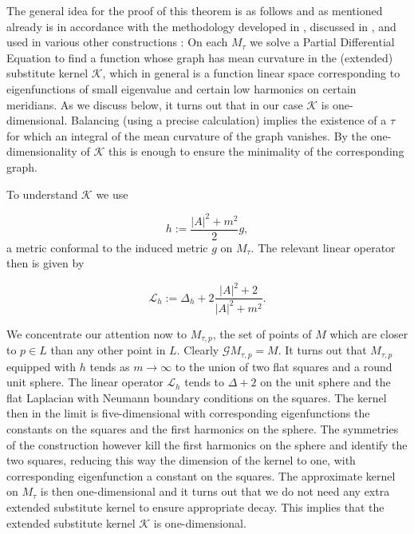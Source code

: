 \documentclass[12pt,namelimits,sumlimits]{amsart}
\theoremstyle{remark}
\numberwithin{equation}{section}
\begin{document}
The general idea for the proof of this theorem is as follows and as mentioned already is in accordance
with the methodology developed in \cite{kapouleas:wente:announce,kapouleas:wente,kapouleas:imc},
discussed in \cite{kapouleas:survey},
and used in various other constructions
\cite{kapouleas:finite,haskins:kapouleas:invent,haskins:kapouleas:survey}:
On each $M_\tau$ we solve a Partial Differential Equation to find a function
whose graph has mean curvature in the (extended) substitute kernel ${\mathscr{K}}$,
which in general is a function linear space corresponding to eigenfunctions of small eigenvalue
and certain low harmonics on certain meridians.
As we discuss below, it turns out that in our case ${\mathscr{K}}$ is one-dimensional.
Balancing (using a precise calculation) implies the existence of a $\tau$
for which an integral of the mean curvature of the graph vanishes.
By the one-dimensionality of ${\mathscr{K}}$ this is enough to ensure the minimality of the corresponding graph.

To understand ${\mathscr{K}}$ we use 
\addtocounter{theorem}{1}
\begin{equation}
\label{Eh}
h:=\frac{|A|^2+m^2}{2}g,
\end{equation}
a metric conformal to the induced metric $g$ on $M_\tau$.
The relevant linear operator then is given by 
\addtocounter{theorem}{1}
\begin{equation}
\label{ELh}
{\ensuremath{\mathcal L_h}}:=\Delta_h+2\frac{|A|^2+2}{|A|^2+m^2}.
\end{equation}

We concentrate our attention now to $M_{\tau,p}$,
the set of points of $M$ which are closer to $p\in L$ than any other point in $L$.
Clearly ${{\mathscr{G}}} M_{\tau,p}=M$.
It turns out that $M_{\tau,p}$ equipped with $h$ tends as $m\to\infty$
to the union of two flat squares and a round unit sphere.
The linear operator ${\ensuremath{\mathcal L_h}}$ tends to $\Delta+2$ on the unit sphere and 
the flat Laplacian with Neumann boundary conditions on the squares.
The kernel then in the limit is five-dimensional with corresponding eigenfunctions
the constants on the squares and the first harmonics on the sphere.
The symmetries of the construction however kill the first harmonics on the sphere
and identify the two squares, reducing this way the dimension of the kernel to one,
with corresponding eigenfunction a constant on the squares.
The approximate kernel on $M_\tau$ is then one-dimensional and it turns out that
we do not need any extra extended substitute kernel to ensure appropriate decay.
This implies that the extended substitute kernel ${\mathscr{K}}$ is one-dimensional.
\end{document}
